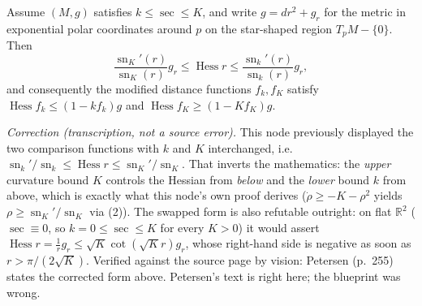 \begin{theorem}
  \label{thm:pet-ch6-rauch-comparison}
  Assume $(M,g)$ satisfies $k\le\sec\le K$, and write $g=dr^2+g_r$ for the
  metric in exponential polar coordinates around $p$ on the star-shaped
  region $T_pM-\{0\}$. Then
  \[
    \frac{\operatorname{sn}_K'(r)}{\operatorname{sn}_K(r)}g_r\le\operatorname{Hess}r\le\frac{\operatorname{sn}_k'(r)}{\operatorname{sn}_k(r)}g_r,
  \]
  and consequently the modified distance functions $f_k,f_K$ satisfy
  $\operatorname{Hess}f_k\le(1-kf_k)g$ and $\operatorname{Hess}f_K\ge(1-Kf_K)g$.

  \emph{Correction (transcription, not a source error).} This node previously
  displayed the two comparison functions with $k$ and $K$ interchanged, i.e.\
  $\operatorname{sn}_k'/\operatorname{sn}_k\le\operatorname{Hess}r\le
  \operatorname{sn}_K'/\operatorname{sn}_K$. That inverts the mathematics: the
  \emph{upper} curvature bound $K$ controls the Hessian from \emph{below} and
  the \emph{lower} bound $k$ from above, which is exactly what this node's own
  proof derives ($\dot\rho\ge-K-\rho^2$ yields $\rho\ge
  \operatorname{sn}_K'/\operatorname{sn}_K$ via
  (2)). The swapped form is also
  refutable outright: on flat $\mathbb{R}^2$ ($\sec\equiv0$, so $k=0\le\sec\le K$
  for every $K>0$) it would assert $\operatorname{Hess}r=\tfrac1rg_r\le
  \sqrt K\cot(\sqrt Kr)g_r$, whose right-hand side is negative as soon as
  $r>\pi/(2\sqrt K)$. Verified against the source page by vision: Petersen
  (p.~255) states the corrected form above. Petersen's text is right here; the
  blueprint was wrong.
\end{theorem}
